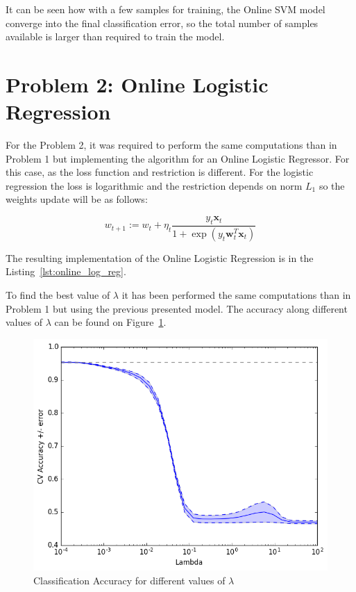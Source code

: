 \documentclass{ethz_report}
\begin{document}
It can be seen how with a few samples for training, the Online SVM model converge into the final classification error, so the total number of samples available is larger than required to train the model.

\section*{Problem 2: Online Logistic Regression}

For the Problem 2, it was required to perform the same computations than in Problem 1 but implementing the algorithm for an Online Logistic Regressor. For this case, as the loss function and restriction is different. For the logistic regression the loss is logarithmic and the restriction depends on norm $L_1$ so the weights update will be as follows:

\begin{equation}
    w_{t+1} := w_t + \eta_t \frac{y_t \mathbf{x}_t}{1 + \exp(y_t \mathbf{w}^T_t \mathbf{x}_t)}
\end{equation}

The resulting implementation of the Online Logistic Regression is in the Listing~\ref{lst:online_log_reg}.



To find the best value of $\lambda$ it has been performed the same computations than in Problem 1 but using the previous presented model. The accuracy along different values of $\lambda$ can be found on Figure~\ref{fig:cv_lambda_reg}.

\begin{figure}[H]
\centering
\includegraphics[width=.85\linewidth]{./img/cross_val_logistic.png}
\caption{Classification Accuracy for different values of $\lambda$}
\label{fig:cv_lambda_reg}
\end{figure}
\end{document}
